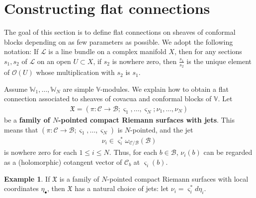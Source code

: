 \documentclass[12pt,a4paper,notitlepage]{report}
\theoremstyle{definition}
\newtheorem{eg}[df]{Example}
\theoremstyle{plain}
\newcommand{\fk}{\mathfrak}
\newcommand{\mc}{\mathcal}
\newcommand{\scr}{\mathscr}
\newcommand{\sgm}{\varsigma}
\newcommand{\blt}{\bullet}
\newcommand{\Vbb}{\mathbb V}
\newcommand{\Wbb}{\mathbb W}
\numberwithin{equation}{section}
\begin{document}
\section{Constructing flat connections}\label{lb146}


The goal of this section is to define flat connections on sheaves of conformal blocks depending on as few parameters as possible. We adopt the following notation: If $\scr L$ is a line bundle on a complex manifold $X$, then for any sections $s_1,s_2$ of $\scr L$ on an open $U\subset X$, if $s_2$ is nowhere zero, then $\frac {s_1}{s_2}$ is the unique element of $\scr O(U)$ whose multiplication with $s_2$ is $s_1$.

Assume $\Wbb_1,\dots,\Wbb_N$ are simple $\Vbb$-modules. We explain how to obtain a flat connection associated to sheaves of covacua and conformal blocks of $\Vbb$. Let
\begin{align*}
\fk X=(\pi:\mc C\rightarrow\mc B;\sgm_1,\dots,\sgm_N;\nu_1,\dots,\nu_N)
\end{align*}
be a \textbf{family of $N$-pointed compact Riemann surfaces with jets}. This means that $(\pi:\mc C\rightarrow\mc B;\sgm_1,\dots,\sgm_N)$ is $N$-pointed, and the jet
\begin{align*}
\nu_i\in\sgm_i^*\omega_{\mc C/\mc B}(\mc B)
\end{align*}
is nowhere zero for each $1\leq i\leq N$. Thus, for each $b\in\mc B$, $\nu_i(b)$ can be regarded as a (holomorphic) cotangent vector of $\mc C_b$ at $\sgm_i(b)$.




\begin{eg}
If $\fk X$ is a family of $N$-pointed compact Riemann surfaces with local coordinates $\eta_\blt$, then $\fk X$ has a natural choice of jets: let $\nu_i=\sgm_i^*d\eta_i$.
\end{eg}
\end{document}
